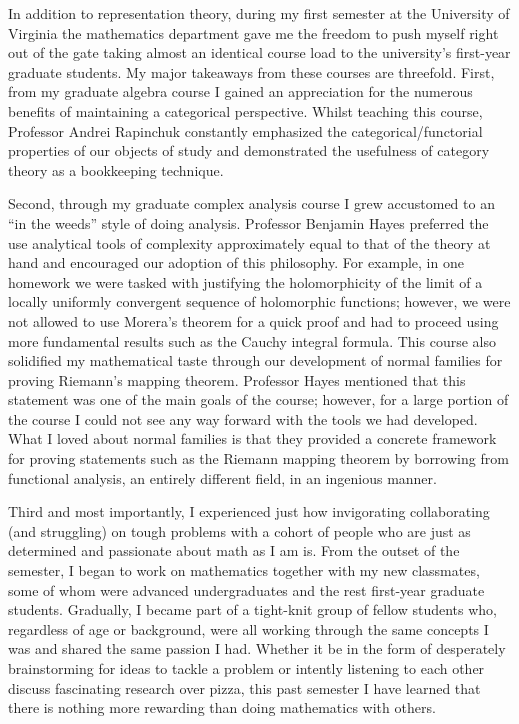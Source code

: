 \documentclass[11pt]{article}
\begin{document}
In addition to representation theory, during my first semester at the University of Virginia the mathematics department gave me the freedom to push myself right out of the gate taking almost an identical course load to the university's first-year graduate students. My major takeaways from these courses are threefold. First, from my graduate algebra course I gained an appreciation for the numerous benefits of maintaining a categorical perspective. Whilst teaching this course, Professor Andrei Rapinchuk constantly emphasized the categorical/functorial properties of our objects of study and demonstrated the usefulness of category theory as a bookkeeping technique.

Second, through my graduate complex analysis course I grew accustomed to an ``in the weeds'' style of doing analysis. Professor Benjamin Hayes preferred the use analytical tools of complexity approximately equal to that of the theory at hand and encouraged our adoption of this philosophy. For example, in one homework we were tasked with justifying the holomorphicity of the limit of a locally uniformly convergent sequence of holomorphic functions; however, we were not allowed to use Morera's theorem for a quick proof and had to proceed using more fundamental results such as the Cauchy integral formula. This course also solidified my mathematical taste through our development of normal families for proving Riemann's mapping theorem. Professor Hayes mentioned that this statement was one of the main goals of the course; however, for a large portion of the course I could not see any way forward with the tools we had developed. What I loved about normal families is that they provided a concrete framework for proving statements such as the Riemann mapping theorem by borrowing from functional analysis, an entirely different field, in an ingenious manner.

Third and most importantly, I experienced just how invigorating collaborating (and struggling) on tough problems with a cohort of people who are just as determined and passionate about math as I am is. From the outset of the semester, I began to work on mathematics together with my new classmates, some of whom were advanced undergraduates and the rest first-year graduate students. Gradually, I became part of a tight-knit group of fellow students who, regardless of age or background, were all working through the same concepts I was and shared the same passion I had. Whether it be in the form of desperately brainstorming for ideas to tackle a problem or intently listening to each other discuss fascinating research over pizza, this past semester I have learned that there is nothing more rewarding than doing mathematics with others. \\
\end{document}
